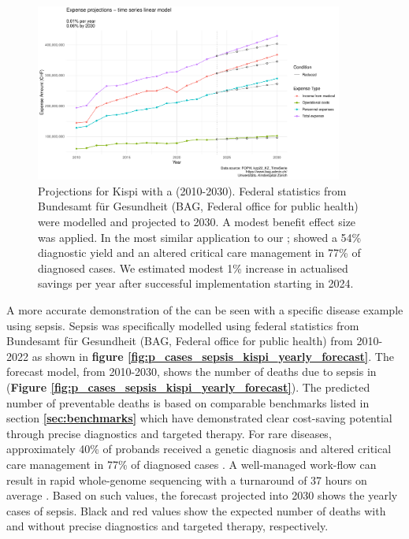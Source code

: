 \begin{figure}[h] \hspace*{0cm} 
\begin{center}
	\includegraphics[width=0.90\textwidth]{../../stats/foph_key_stats/output/p_cost}
	\caption{Projections for Kispi with a \pmu (2010-2030). Federal statistics from Bundesamt für Gesundheit (BAG, Federal office for public health) were modelled and projected to 2030. A modest benefit effect size was applied. 
	In the most similar application to our \pmu; 
	\citet{lunke2023integrated} 
	showed a 54\% diagnostic yield and an altered critical care management in 77\% of diagnosed cases.
	We estimated modest 1\% increase in actualised savings per year after successful implementation starting in 2024.}
	\label{fig:cost_analysis}
\end{center}
\end{figure}

A more accurate demonstration of the \pmu can be seen with a specific disease example using sepsis.
Sepsis was specifically modelled using federal statistics from Bundesamt für Gesundheit (BAG, Federal office for public health) from 2010-2022 as shown in 
\textbf{figure
\ref{fig:p_cases_sepsis_kispi_yearly_forecast}}.
The forecast model, from 2010-2030, shows the number of deaths due to sepsis in \kispi (\textbf{Figure \ref{fig:p_cases_sepsis_kispi_yearly_forecast}}).
The predicted number of preventable deaths is based on comparable benchmarks listed in section 
\textbf{\ref{sec:benchmarks}}
which have demonstrated clear cost-saving potential through precise diagnostics and targeted therapy.
For rare diseases, approximately 40\% of probands received a genetic diagnosis 
\citep{wright2023genomic, wojcik2024genome}
and altered critical care management in 77\% of diagnosed cases \citep{lunke2023integrated}.
A well-managed work-flow can result in rapid whole-genome sequencing with a turnaround of 37 hours on average
 \citep{abou2023rapid}.
Based on such values, the forecast  projected into 2030 shows the yearly cases of sepsis.
Black and red values show the expected number of deaths with and without  precise diagnostics and targeted therapy, respectively. 

